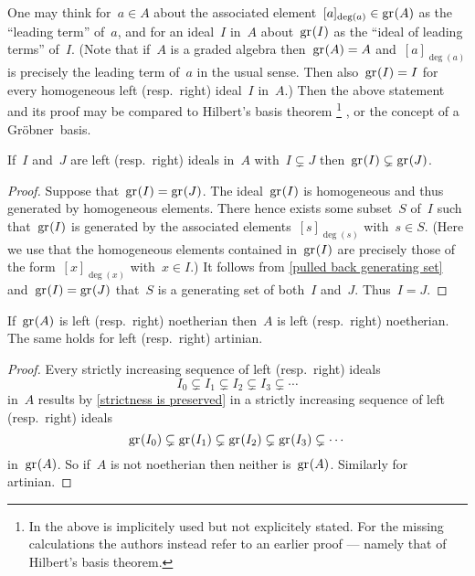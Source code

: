 \begin{remark}
  One may think for~$a \in A$ about the associated element~$[a]_{\deg(a)} \in \gr(A)$ as the \enquote{leading term} of~$a$, and for an ideal~$I$ in~$A$ about~$\gr(I)$ as the \enquote{ideal of leading terms} of~$I$.
  (Note that if~$A$ is a graded algebra then~$\gr(A) = A$ and~$[a]_{\deg(a)}$ is precisely the leading term of~$a$ in the usual sense.
  Then also~$\gr(I) = I$ for every homogeneous left (resp.\ right) ideal~$I$ in~$A$.)
  Then the above statement and its proof may be compared to Hilbert’s basis theorem%
  \footnote{In \cite[Proposition~6.7]{noncommutative_noetherian} the above  is implicitely used but not explicitely stated.
  For the missing calculations the authors instead refer to an earlier proof --- namely that of Hilbert’s basis theorem.}%
  , or the concept of a Gröbner~basis.
\end{remark}


\begin{corollary}
  \label{strictness is preserved}
  If~$I$ and~$J$ are left (resp.\ right) ideals in~$A$ with~$I \subsetneq J$ then~$\gr(I) \subsetneq \gr(J)$.
\end{corollary}

\begin{proof}
  Suppose that~$\gr(I) = \gr(J)$.
  The ideal~$\gr(I)$ is homogeneous and thus generated by homogeneous elements.
  There hence exists some subset~$S$ of~$I$ such that~$\gr(I)$ is generated by the associated elements~$[s]_{\deg(s)}$ with~$s \in S$.
  (Here we use that the homogeneous elements contained in~$\gr(I)$ are precisely those of the form~$[x]_{\deg(x)}$ with~$x \in I$.)
  It follows from \cref{pulled back generating set} and~$\gr(I) = \gr(J)$ that~$S$ is a generating set of both~$I$ and~$J$.
  Thus~$I = J$.
\end{proof}

\begin{corollary}
  \label{associated graded reflects noetherian and artinian}
  If~$\gr(A)$ is left (resp.\ right) noetherian then~$A$ is left (resp.\ right) noetherian.
  The same holds for left (resp.\ right) artinian.
\end{corollary}

\begin{proof}
  Every strictly increasing sequence of left (resp.\ right) ideals
  \[
    I_0
    \subsetneq
    I_1
    \subsetneq
    I_2
    \subsetneq
    I_3
    \subsetneq
    \dotsb
  \]
  in~$A$ results by \cref{strictness is preserved} in a strictly increasing sequence of left (resp.\ right) ideals
  \[
    \gr(I_0)
    \subsetneq
    \gr(I_1)
    \subsetneq
    \gr(I_2)
    \subsetneq
    \gr(I_3)
    \subsetneq
    \dotsb
  \]
  in~$\gr(A)$.
  So if~$A$ is not noetherian then neither is~$\gr(A)$.
  Similarly for artinian.
\end{proof}

